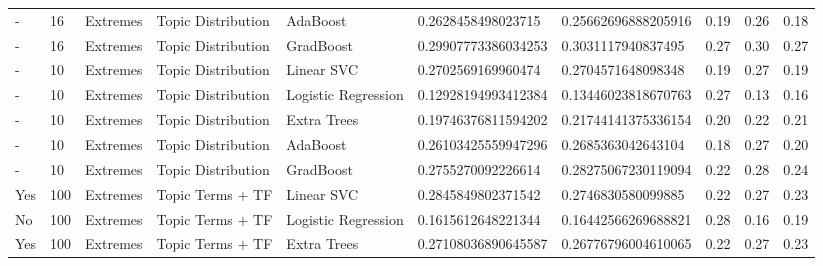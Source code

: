 \begin{table}[]
\begin{tabular}{@{}llllllllll@{}}
    -                   & 16              & Extremes              & Topic Distribution    & AdaBoost            & 0.2628458498023715      & 0.25662696888205916    & 0.19               & 0.26            & 0.18              \\
    -                   & 16              & Extremes              & Topic Distribution    & GradBoost           & 0.29907773386034253     & 0.3031117940837495     & 0.27               & 0.30            & 0.27              \\
    -                   & 10              & Extremes              & Topic Distribution    & Linear SVC          & 0.2702569169960474      & 0.2704571648098348     & 0.19               & 0.27            & 0.19              \\
    -                   & 10              & Extremes              & Topic Distribution    & Logistic Regression & 0.12928194993412384     & 0.13446023818670763    & 0.27               & 0.13            & 0.16              \\
    -                   & 10              & Extremes              & Topic Distribution    & Extra Trees         & 0.19746376811594202     & 0.21744141375336154    & 0.20               & 0.22            & 0.21              \\
    -                   & 10              & Extremes              & Topic Distribution    & AdaBoost            & 0.26103425559947296     & 0.2685363042643104     & 0.18               & 0.27            & 0.20              \\
    -                   & 10              & Extremes              & Topic Distribution    & GradBoost           & 0.2755270092226614      & 0.28275067230119094    & 0.22               & 0.28            & 0.24              \\
    Yes                 & 100             & Extremes              & Topic Terms + TF      & Linear SVC          & 0.2845849802371542      & 0.2746830580099885     & 0.22               & 0.27            & 0.23              \\
    No                  & 100             & Extremes              & Topic Terms + TF      & Logistic Regression & 0.1615612648221344      & 0.16442566269688821    & 0.28               & 0.16            & 0.19              \\
    Yes                 & 100             & Extremes              & Topic Terms + TF      & Extra Trees         & 0.27108036890645587     & 0.26776796004610065    & 0.22               & 0.27            & 0.23              \\

\end{tabular}
\end{table}
